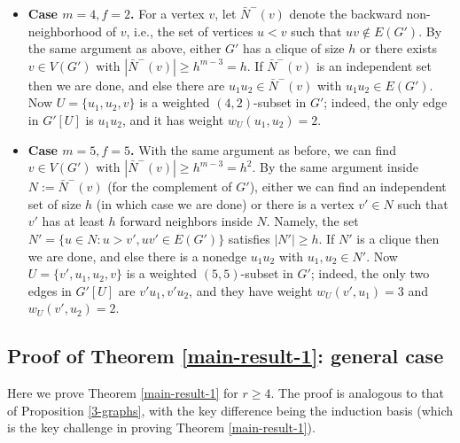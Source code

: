 \documentclass[11pt]{article}
\let\oldendproof\endproof
\renewenvironment{proof}[1][\proofname]{%
	\oldproof[\bf #1]%
}{\oldendproof}
\theoremstyle{plain}
\begin{document}
\begin{proof}[Proof of Lemma \ref{3-graphs induction}]
    \begin{itemize}
        \item 
        {\bf Case $m=4,f=2$.} For a vertex $v$, let $\bar{N}^-(v)$ denote the backward non-neighborhood of $v$, i.e., the set of vertices $u < v$ such that $uv \notin E(G')$.
        By the same argument as above, either $G'$ has a clique of size $h$ or there exists $v \in V(G')$ with $|\bar{N}^-(v)| \geq h^{m-3} = h$. If $\bar{N}^-(v)$ is an independent set then we are done, and else there are $u_1 u_2 \in \bar{N}^-(v)$ with $u_1u_2 \in E(G')$. Now $U=\{u_1,u_2,v\}$ is a weighted $(4,2)$-subset in $G'$; indeed, the only edge in $G'[U]$ is $u_1u_2$, and it has weight $w_U(u_1,u_2)=2$.
        \item {\bf Case $m=5,f=5$.} With the same argument as before, we can find $v \in V(G')$ with 
        $|\bar{N}^-(v)| \geq h^{m-3} = h^2$.
        By the same argument inside $N := \bar{N}^-(v)$ (for the complement of $G'$), either we can find an independent set of size $h$ (in which case we are done) or there is a vertex $v' \in N$ such that $v'$ has at least $h$ forward neighbors inside $N$. Namely, the set $N' = \{u \in N : u > v', uv' \in E(G')\}$ satisfies $|N'| \geq h$. 
        If $N'$ is a clique then we are done, and else there is a nonedge $u_1u_2$ with $u_1,u_2 \in N'$. 
        Now $U=\{v',u_1,u_2,v\}$ is a weighted $(5,5)$-subset in $G'$; indeed, the only two edges in $G'[U]$ are $v'u_1,v'u_2$, and they have weight $w_U(v',u_1) = 3$ and $w_U(v',u_2)=2$.
    \end{itemize}
\end{proof}



\subsection{Proof of Theorem \ref{main-result-1}: general case} \label{subsec:general case}

Here we prove Theorem \ref{main-result-1} for $r \geq 4$. 
The proof is analogous to that of Proposition \ref{3-graphs}, with the key difference being the induction basis (which is the key challenge in proving Theorem \ref{main-result-1}). 
\end{document}
